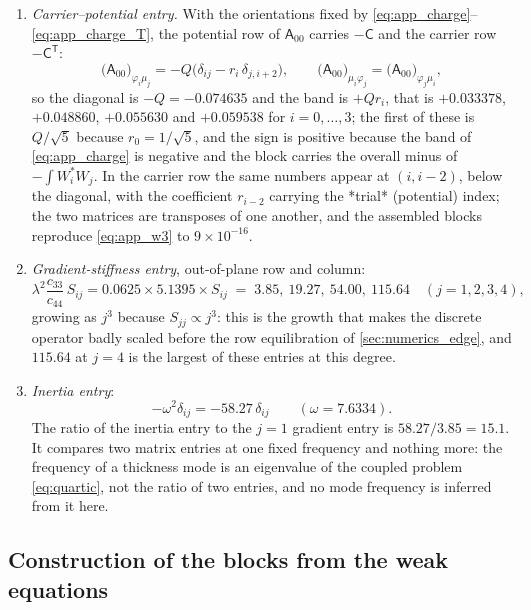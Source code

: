\begin{enumerate}
that diffusion penalises thickness structure.
\item \emph{Carrier--potential entry.}  With the orientations fixed by
\eqref{eq:app_charge}--\eqref{eq:app_charge_T}, the potential row of
$\mathsf A_{00}$ carries $-\mathsf C$ and the carrier row
$-\mathsf C^{\mathsf T}$:
\begin{equation}
\label{eq:app_w3}
\bigl(\mathsf A_{00}\bigr)_{\varphi_i\mu_j}
=-Q\bigl(\delta_{ij}-r_i\,\delta_{j,i+2}\bigr),
\qquad
\bigl(\mathsf A_{00}\bigr)_{\mu_i\varphi_j}
=\bigl(\mathsf A_{00}\bigr)_{\varphi_j\mu_i},
\end{equation}
so the diagonal is $-Q=-0.074635$ and the band is $+Qr_i$, that is $+0.033378$,
$+0.048860$, $+0.055630$ and $+0.059538$ for $i=0,\dots,3$; the first of these is
$Q/\sqrt{5}$ because $r_0=1/\sqrt{5}$, and the sign is positive because the
band of \eqref{eq:app_charge} is negative and the block carries the overall minus
of $-\int W_i^{*}W_j$.  In the carrier row the same numbers appear at
$(i,i-2)$, below the diagonal, with the coefficient $r_{i-2}$ carrying the
*trial* (potential) index; the two matrices are transposes of one another, and
the assembled blocks reproduce \eqref{eq:app_w3} to $9\times10^{-16}$.
\item \emph{Gradient-stiffness entry}, out-of-plane row and column:
\begin{equation}
\label{eq:app_w4}
\lambda^{2}\frac{c_{33}}{c_{44}}\,S_{ij}
=0.0625\times5.1395\times S_{ij}
\;=\;3.85,\ 19.27,\ 54.00,\ 115.64 \quad (j=1,2,3,4),
\end{equation}
growing as $j^{3}$ because $S_{jj}\propto j^{3}$: this is the growth that makes
the discrete operator badly scaled before the row equilibration of
\cref{sec:numerics_edge}, and $115.64$ at $j=4$ is the largest of these entries at
this degree.
\item \emph{Inertia entry}:
\begin{equation}
\label{eq:app_w5}
-\omega^{2}\delta_{ij}=-58.27\,\delta_{ij}\qquad(\omega=7.6334).
\end{equation}
The ratio of the inertia entry to the $j=1$ gradient entry is
$58.27/3.85=15.1$.  It compares two matrix entries at one fixed frequency and
nothing more: the frequency of a thickness mode is an eigenvalue of the coupled
problem \eqref{eq:quartic}, not the ratio of two entries, and no mode frequency is
inferred from it here.
\end{enumerate}

\subsection{Construction of the blocks from the weak equations}

